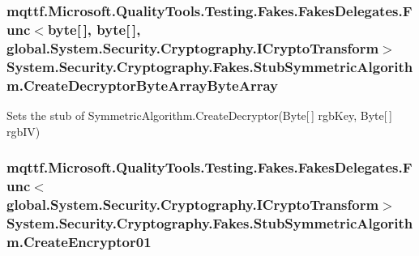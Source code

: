 \hypertarget{class_system_1_1_security_1_1_cryptography_1_1_fakes_1_1_stub_symmetric_algorithm_a0ff61df98186a7e15fe4db8c254a5e56}{
\subsubsection[{Create\-Decryptor\-Byte\-Array\-Byte\-Array}]{\setlength{\rightskip}{0pt plus 5cm}mqttf.\-Microsoft.\-Quality\-Tools.\-Testing.\-Fakes.\-Fakes\-Delegates.\-Func$<$byte\mbox{[}$\,$\mbox{]}, byte\mbox{[}$\,$\mbox{]}, global.\-System.\-Security.\-Cryptography.\-I\-Crypto\-Transform$>$ System.\-Security.\-Cryptography.\-Fakes.\-Stub\-Symmetric\-Algorithm.\-Create\-Decryptor\-Byte\-Array\-Byte\-Array}}\label{class_system_1_1_security_1_1_cryptography_1_1_fakes_1_1_stub_symmetric_algorithm_a0ff61df98186a7e15fe4db8c254a5e56}


Sets the stub of Symmetric\-Algorithm.\-Create\-Decryptor(\-Byte\mbox{[}$\,$\mbox{]} rgb\-Key, Byte\mbox{[}$\,$\mbox{]} rgb\-I\-V)

\hypertarget{class_system_1_1_security_1_1_cryptography_1_1_fakes_1_1_stub_symmetric_algorithm_a7e6e0267f843f233ed862731f70861bf}{
\subsubsection[{Create\-Encryptor01}]{\setlength{\rightskip}{0pt plus 5cm}mqttf.\-Microsoft.\-Quality\-Tools.\-Testing.\-Fakes.\-Fakes\-Delegates.\-Func$<$global.\-System.\-Security.\-Cryptography.\-I\-Crypto\-Transform$>$ System.\-Security.\-Cryptography.\-Fakes.\-Stub\-Symmetric\-Algorithm.\-Create\-Encryptor01}}\label{class_system_1_1_security_1_1_cryptography_1_1_fakes_1_1_stub_symmetric_algorithm_a7e6e0267f843f233ed862731f70861bf}


